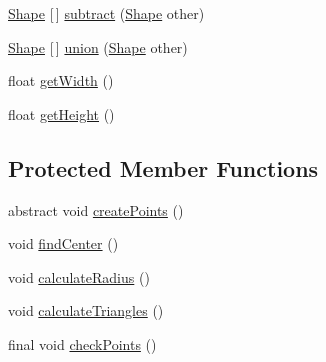 \begin{DoxyCompactItemize}
\item 
\mbox{\hyperlink{classorg_1_1newdawn_1_1slick_1_1geom_1_1_shape}{Shape}} \mbox{[}$\,$\mbox{]} \mbox{\hyperlink{classorg_1_1newdawn_1_1slick_1_1geom_1_1_shape_adac7ff5c7e4ac717b6b2954adbb39bc8}{subtract}} (\mbox{\hyperlink{classorg_1_1newdawn_1_1slick_1_1geom_1_1_shape}{Shape}} other)
\item 
\mbox{\hyperlink{classorg_1_1newdawn_1_1slick_1_1geom_1_1_shape}{Shape}} \mbox{[}$\,$\mbox{]} \mbox{\hyperlink{classorg_1_1newdawn_1_1slick_1_1geom_1_1_shape_a42ca84bd58011bc1d82d077d994bd9f1}{union}} (\mbox{\hyperlink{classorg_1_1newdawn_1_1slick_1_1geom_1_1_shape}{Shape}} other)
\item 
float \mbox{\hyperlink{classorg_1_1newdawn_1_1slick_1_1geom_1_1_shape_aa5a7939b4bbd8e225820b5d5f1efe9e1}{get\+Width}} ()
\item 
float \mbox{\hyperlink{classorg_1_1newdawn_1_1slick_1_1geom_1_1_shape_a13854472f74dc780d8f45411efbb10bf}{get\+Height}} ()
\end{DoxyCompactItemize}
\subsection*{Protected Member Functions}
\begin{DoxyCompactItemize}
\item 
abstract void \mbox{\hyperlink{classorg_1_1newdawn_1_1slick_1_1geom_1_1_shape_a2f5907ca87e87f8794161f46389ff8c8}{create\+Points}} ()
\item 
void \mbox{\hyperlink{classorg_1_1newdawn_1_1slick_1_1geom_1_1_shape_ac90548bc552524c42ca2daad8e1ba692}{find\+Center}} ()
\item 
void \mbox{\hyperlink{classorg_1_1newdawn_1_1slick_1_1geom_1_1_shape_a276adc040a678116054b860c4eb5adab}{calculate\+Radius}} ()
\item 
void \mbox{\hyperlink{classorg_1_1newdawn_1_1slick_1_1geom_1_1_shape_adb889f4f2a9d2838790ead72bf3df1f1}{calculate\+Triangles}} ()
\item 
final void \mbox{\hyperlink{classorg_1_1newdawn_1_1slick_1_1geom_1_1_shape_a84293802d05e8666a441720bfc12745d}{check\+Points}} ()
\end{DoxyCompactItemize}
